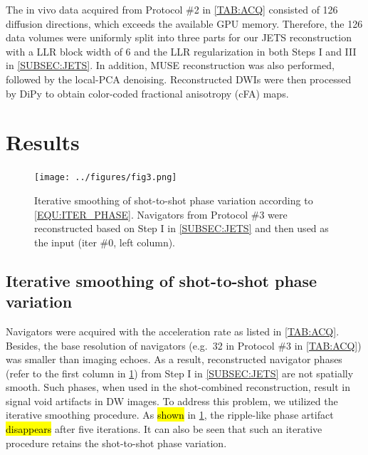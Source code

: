 \documentclass[preprint,12pt,authoryear,review]{elsarticle}
\begin{document}
    The in vivo data acquired from Protocol \#2 in \cref{TAB:ACQ}
    consisted of 126 diffusion directions,
    which exceeds the available GPU memory.
    Therefore, the 126 data volumes were uniformly split
    into three parts for our JETS reconstruction
    with a LLR block width of 6 and the LLR regularization
    in both Steps I and III in \cref{SUBSEC:JETS}.
    In addition, MUSE reconstruction was also performed,
    followed by the local-PCA denoising.
    Reconstructed DWIs were then processed
    by DiPy \citep{garyfallidis_2014_dipy}
    to obtain color-coded fractional anisotropy (cFA) maps.

    \pagebreak

    \section{Results}
    \label{SEC_Resl}


    \begin{figure}
        \centering
        \texttt{[image: ../figures/fig3.png]}
        \caption{Iterative smoothing of shot-to-shot phase variation
        according to \cref{EQU:ITER_PHASE}.
        Navigators from Protocol \#3 were reconstructed
        based on Step I in \cref{SUBSEC:JETS}
        and then used as the input (iter \#0, left column).}
        \label{FIG:iter_phase}
    \end{figure}

    \subsection{Iterative smoothing of shot-to-shot phase variation}

    Navigators were acquired with the acceleration rate
    as listed in \cref{TAB:ACQ}.
    Besides, the base resolution of navigators
    (e.g.~32 in Protocol \#3 in \cref{TAB:ACQ})
    was smaller than imaging echoes.
    As a result, reconstructed navigator phases
    (refer to the first column in \cref{FIG:iter_phase})
    from Step I in \cref{SUBSEC:JETS}
    are not spatially smooth.
    Such phases, when used in the shot-combined reconstruction,
    result in signal void artifacts in DW images.
    To address this problem, we utilized the iterative smoothing procedure.
    As \hl{shown} in \cref{FIG:iter_phase},
    the ripple-like phase artifact \hl{disappears} after five iterations.
    It can also be seen that such an iterative procedure retains
    the shot-to-shot phase variation.
\end{document}
